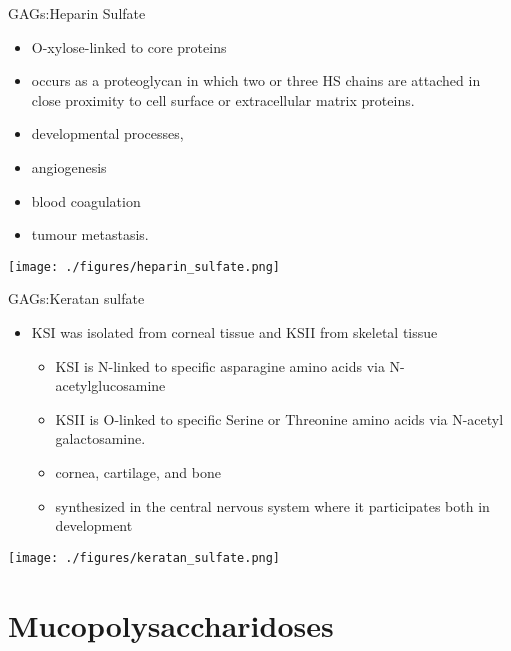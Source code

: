 \documentclass[presentation, smaller]{beamer}
\begin{document}
\begin{frame}[label={sec:org6a74776}]{GAGs:Heparin Sulfate}
\begin{itemize}
\item O-xylose-linked to core proteins
\item occurs as a proteoglycan in which two or three HS chains are
attached in close proximity to cell surface or extracellular matrix
proteins.
\item developmental processes,
\item angiogenesis
\item blood coagulation
\item tumour metastasis.
\end{itemize}

\begin{center}
\texttt{[image: ./figures/heparin\_sulfate.png]}
\label{org2d0db3b}
\end{center}
\end{frame}

\begin{frame}[label={sec:org4fe44ad}]{GAGs:Keratan sulfate}
\begin{itemize}
\item KSI was isolated from corneal tissue and KSII from skeletal tissue
\begin{itemize}
\item KSI is N-linked to specific asparagine amino acids via
N-acetylglucosamine
\item KSII is O-linked to specific Serine or Threonine amino acids via
N-acetyl galactosamine.
\item cornea, cartilage, and bone
\item synthesized in the central nervous system where it participates both
in development
\end{itemize}
\end{itemize}

\begin{center}
\texttt{[image: ./figures/keratan\_sulfate.png]}
\label{orgc2cff85}
\end{center}
\end{frame}

\section{Mucopolysaccharidoses}
\label{sec:orge93f51f}
\end{document}
